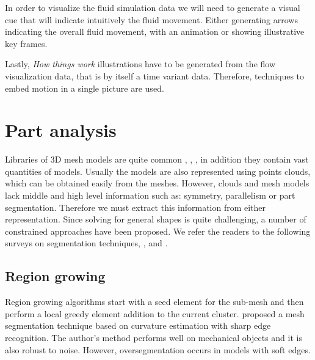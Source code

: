 In order to visualize the fluid simulation data we will need to generate a visual cue that will indicate intuitively the fluid movement.
Either generating arrows indicating the overall fluid movement, with an animation or showing illustrative key frames.

Lastly, \textit{How things work} illustrations have to be generated from the flow visualization data, that is by itself a time variant data.
Therefore, techniques to embed motion in a single picture are used.

\section{Part analysis}
\label{sec:partAnalysis}

Libraries of 3D mesh models are quite common \cite{Trimble2014}, \cite{GrabCAD2014}, \cite{Autodesk2014}, in addition they contain vast quantities of models.   
Usually the models are also represented using points clouds, which can be obtained easily from the meshes.
However, clouds and mesh models lack middle and high level information such as: symmetry, parallelism or part segmentation.
Therefore we must extract this information from either representation.
Since solving for general shapes is quite challenging, a number of constrained approaches have been proposed.
We refer the readers to the following surveys on segmentation techniques, \cite{Varady1997}, \cite{Agathos2007} and \cite{Shamir2008}.

\subsection{Region growing}

Region growing algorithms start with a seed element for the sub-mesh and then perform a local greedy element addition to the current cluster.
\cite{Mizoguchi2006} proposed a mesh segmentation technique based on curvature estimation with sharp edge recognition.
The author's method performs well on mechanical objects and it is also robust to noise.
However, oversegmentation occurs in models with soft edges.


